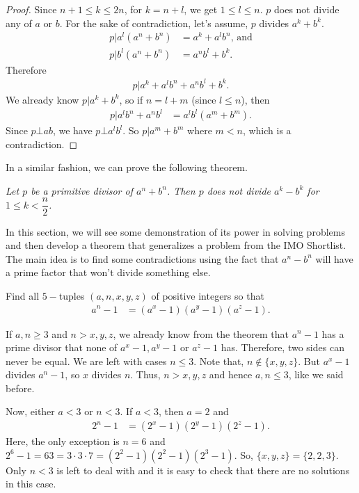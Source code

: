 \documentclass{subfile}
\begin{document}
		\begin{proof}
			Since $n+1\leq k\leq2n$, for $k=n+l$, we get $1\leq l\leq n$. $p$ does not divide any of $a$ or $b$. For the sake of contradiction, let's assume, $p$ divides $a^k+b^k$.
				\begin{align*}
					p | a^l(a^n+b^n) &= a^k+a^lb^n\text {, and}\\
					p |b^l(a^n+b^n) &= a^nb^l+b^k.
				\end{align*}
			Therefore
			\begin{align*}
				p |a^k+a^lb^n+a^nb^l+b^k.
			\end{align*}
			We already know $p|a^k+b^k$, so if $n=l+m$ (since $l\leq n$), then
				\begin{align*}
					p|a^lb^n+a^nb^l & = a^lb^l(a^m+b^m).
				\end{align*}
			Since $p\bot ab$, we have $p\bot a^lb^l$. So $p|a^m+b^m$ where $m< n$, which is a contradiction.
		\end{proof}
	In a similar fashion, we can prove the following theorem.
		\begin{theorem}\slshape
			Let $p$ be a primitive divisor of $a^n+b^n$. Then $p$ does not divide $a^k-b^k$ for $1\leq k<\dfrac{n}{2}$.
		\end{theorem}

	In this section, we will see some demonstration of its power in solving problems and then develop a theorem that generalizes a problem from the IMO Shortlist. The main idea is to find some contradictions using the fact that $a^n-b^n$ will have a prime factor that won't divide something else.
		\begin{problem}
			Find all $5-$tuples $(a,n,x,y,z)$ of positive integers so that
				\begin{align*}
					a^n-1 & = (a^x-1)(a^y-1)(a^z-1).
				\end{align*}
		\end{problem}

		\begin{solution}
			If $a,n\geq3$ and $n>x,y,z$, we already know from the theorem that $a^n-1$ has a prime divisor that none of $a^x-1,a^y-1$ or $a^z-1$ has. Therefore, two sides can never be equal. We are left with cases $n\leq3$. Note that, $n\notin\{x,y,z\}$. But $a^x-1$ divides $a^n-1$, so $x$ divides $n$. Thus, $n>x,y,z$ and hence $a,n\leq3$, like we said before.

			Now, either $a<3$ or $n<3$. If $a<3$, then $a=2$ and
				\begin{align*}
					2^n-1 & = (2^x-1)(2^y-1)(2^z-1).
				\end{align*}
			Here, the only exception is $n=6$ and $2^6-1=63=3\cdot3\cdot7=(2^2-1)(2^2-1)(2^3-1)$. So, $\{x,y,z\}=\{2,2,3\}$. Only $n<3$ is left to deal with and it is easy to check that there are no solutions in this case.
		\end{solution}
\end{document}
